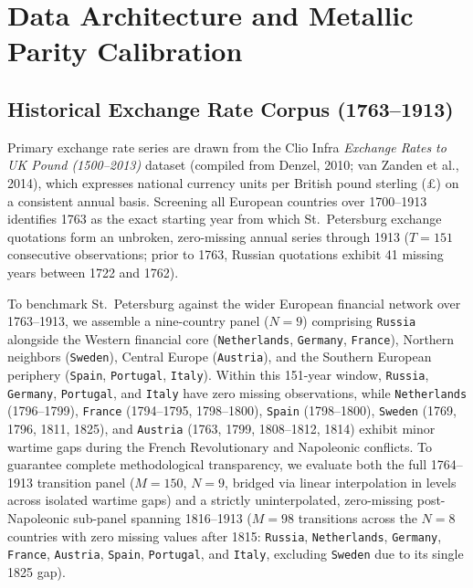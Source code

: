 \documentclass[11pt,a4paper]{article}
\begin{document}
\section{Data Architecture and Metallic Parity Calibration}

\subsection{Historical Exchange Rate Corpus (1763--1913)}
Primary exchange rate series are drawn from the Clio Infra \emph{Exchange Rates to UK Pound (1500--2013)} dataset (compiled from Denzel, 2010; van Zanden et al., 2014), which expresses national currency units per British pound sterling (£) on a consistent annual basis. Screening all European countries over 1700--1913 identifies 1763 as the exact starting year from which St.~Petersburg exchange quotations form an unbroken, zero-missing annual series through 1913 ($T = 151$ consecutive observations; prior to 1763, Russian quotations exhibit 41 missing years between 1722 and 1762).

To benchmark St.~Petersburg against the wider European financial network over 1763--1913, we assemble a nine-country panel ($N=9$) comprising \texttt{Russia} alongside the Western financial core (\texttt{Netherlands}, \texttt{Germany}, \texttt{France}), Northern neighbors (\texttt{Sweden}), Central Europe (\texttt{Austria}), and the Southern European periphery (\texttt{Spain}, \texttt{Portugal}, \texttt{Italy}). Within this 151-year window, \texttt{Russia}, \texttt{Germany}, \texttt{Portugal}, and \texttt{Italy} have zero missing observations, while \texttt{Netherlands} (1796--1799), \texttt{France} (1794--1795, 1798--1800), \texttt{Spain} (1798--1800), \texttt{Sweden} (1769, 1796, 1811, 1825), and \texttt{Austria} (1763, 1799, 1808--1812, 1814) exhibit minor wartime gaps during the French Revolutionary and Napoleonic conflicts. To guarantee complete methodological transparency, we evaluate both the full 1764--1913 transition panel ($M = 150$, $N=9$, bridged via linear interpolation in levels across isolated wartime gaps) and a strictly uninterpolated, zero-missing post-Napoleonic sub-panel spanning 1816--1913 ($M = 98$ transitions across the $N=8$ countries with zero missing values after 1815: \texttt{Russia}, \texttt{Netherlands}, \texttt{Germany}, \texttt{France}, \texttt{Austria}, \texttt{Spain}, \texttt{Portugal}, and \texttt{Italy}, excluding \texttt{Sweden} due to its single 1825 gap).
\end{document}
